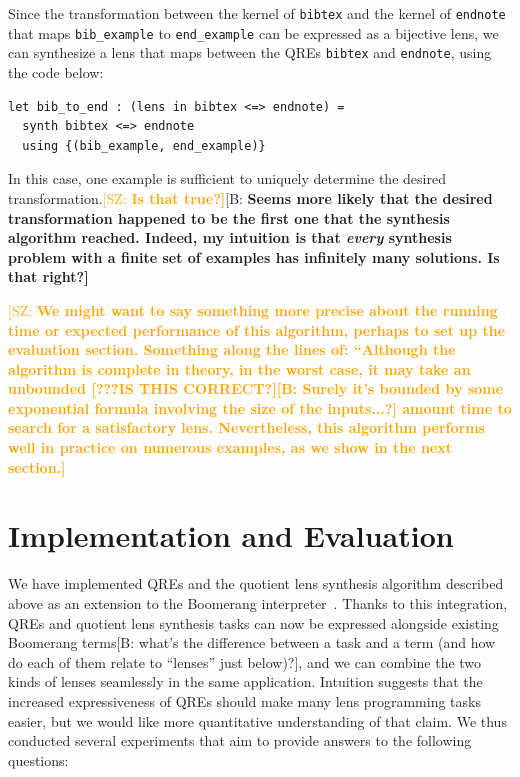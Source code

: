 \documentclass[acmsmall,review,anonymous]{acmart}
\newcommand{\FINISH}[3]{\ifdraft\textcolor{#1}{[#2: #3]}\fi}
\newcommand{\bcp}[1]{\FINISH{dkred}{B}{#1}}
\newcommand{\BCP}[1]{\FINISH{dkred}{B}{\bf #1}}
\newcommand{\SAZ}[1]{\FINISH{orange}{SZ}{\bf #1}}
\newcommand{\cd}[1]{\lstinline[backgroundcolor=\color{white}]$#1$}
\begin{document}
Since the transformation between the kernel of \cd{bibtex} and the kernel of
\cd{endnote} that maps \cd{bib_example} to \cd{end_example} can be
expressed as a bijective lens, we can synthesize a lens that maps between the
QREs \cd{bibtex} and \cd{endnote}, using the code below:

\begin{lstlisting}
let bib_to_end : (lens in bibtex <=> endnote) = 
  synth bibtex <=> endnote
  using {(bib_example, end_example)}
\end{lstlisting}

In this case, one example is sufficient to uniquely determine the desired
transformation.\SAZ{Is that true?}\BCP{Seems more likely that the desired
  transformation happened to be the first one that the synthesis algorithm
  reached.  Indeed, my intuition is that {\em every} synthesis problem with
  a finite set of examples has infinitely many solutions.  Is that right?}

\SAZ{We might want to say something more precise about the running time or
  expected performance of this algorithm, perhaps to set up the evaluation
  section.  Something along the lines of: ``Although the algorithm is complete
  in theory, in the worst case, it may take an unbounded [???IS THIS
  CORRECT?]\bcp{Surely it's bounded by some exponential formula involving the
    size of the inputs...?} 
  amount time to search for a satisfactory lens.  Nevertheless, this algorithm
  performs well in practice on numerous examples, as we show in the next
  section.} 


\section{Implementation and Evaluation}
\label{impl}


We have implemented QREs and the quotient lens synthesis algorithm described
above as an extension to the Boomerang interpreter~\cite{boomerang,quotientlenses}. Thanks to this integration, QREs and quotient lens
synthesis tasks can now be expressed alongside existing Boomerang
terms\bcp{what's the difference between a task and a term (and how do each
  of them relate to ``lenses'' just below)?}, and we
can combine the two kinds of lenses seamlessly in the same application.
Intuition suggests that the increased expressiveness of QREs should make many
lens programming tasks easier, but we would like more quantitative understanding
of that claim.  We thus conducted several experiments that aim to provide
answers to the following questions:
\end{document}
